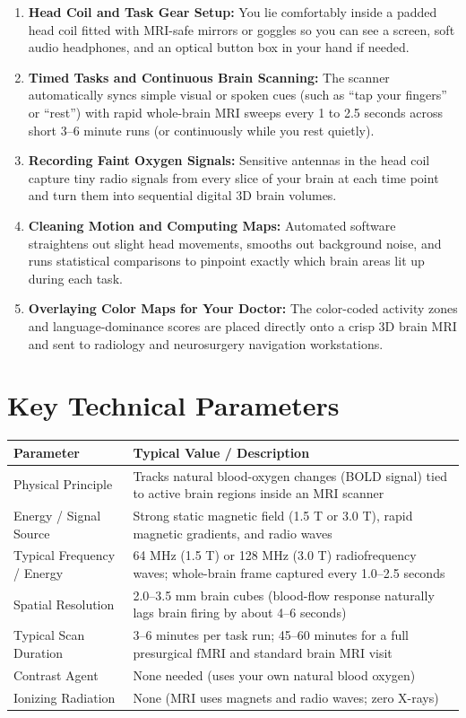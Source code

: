 \begin{enumerate}
    \item \textbf{Head Coil and Task Gear Setup:} You lie comfortably inside a padded head coil fitted with MRI-safe mirrors or goggles so you can see a screen, soft audio headphones, and an optical button box in your hand if needed.
    \item \textbf{Timed Tasks and Continuous Brain Scanning:} The scanner automatically syncs simple visual or spoken cues (such as ``tap your fingers'' or ``rest'') with rapid whole-brain MRI sweeps every 1 to 2.5 seconds across short 3--6 minute runs (or continuously while you rest quietly).
    \item \textbf{Recording Faint Oxygen Signals:} Sensitive antennas in the head coil capture tiny radio signals from every slice of your brain at each time point and turn them into sequential digital 3D brain volumes.
    \item \textbf{Cleaning Motion and Computing Maps:} Automated software straightens out slight head movements, smooths out background noise, and runs statistical comparisons to pinpoint exactly which brain areas lit up during each task.
    \item \textbf{Overlaying Color Maps for Your Doctor:} The color-coded activity zones and language-dominance scores are placed directly onto a crisp 3D brain MRI and sent to radiology and neurosurgery navigation workstations.
\end{enumerate}

\section{Key Technical Parameters}

\noindent\begin{tabularx}{\textwidth}{@{}l X@{}}
\toprule
\textbf{Parameter} & \textbf{Typical Value / Description} \\
\midrule
Physical Principle & Tracks natural blood-oxygen changes (BOLD signal) tied to active brain regions inside an MRI scanner \\
Energy / Signal Source & Strong static magnetic field (1.5 T or 3.0 T), rapid magnetic gradients, and radio waves \\
Typical Frequency / Energy & 64 MHz (1.5 T) or 128 MHz (3.0 T) radiofrequency waves; whole-brain frame captured every 1.0--2.5 seconds \\
Spatial Resolution & 2.0--3.5 mm brain cubes (blood-flow response naturally lags brain firing by about 4--6 seconds) \\
Typical Scan Duration & 3--6 minutes per task run; 45--60 minutes for a full presurgical fMRI and standard brain MRI visit \\
Contrast Agent & None needed (uses your own natural blood oxygen) \\
Ionizing Radiation & None (MRI uses magnets and radio waves; zero X-rays) \\
\bottomrule
\end{tabularx}

